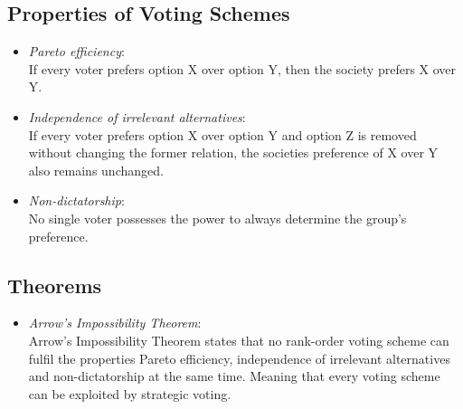 \documentclass[conference]{IEEEtran}
\begin{document}
\subsection{Properties of Voting Schemes}
\begin{itemize}
    \item \textit{Pareto efficiency}:\\
    If every voter prefers option X over option Y, then the society prefers X over Y.
    \item \textit{Independence of irrelevant alternatives}:\\
    If every voter prefers option X over option Y and option Z is removed without changing the former relation, the societies preference of X over Y also remains unchanged.
    \item \textit{Non-dictatorship}:\\
    No single voter possesses the power to always determine the group's preference.
\end{itemize}

\subsection{Theorems}
\begin{itemize}
    \item \textit{Arrow's Impossibility Theorem}\cite{arrow2012social}:\\
    Arrow's Impossibility Theorem states that no rank-order voting scheme can fulfil the properties Pareto efficiency, independence of irrelevant alternatives and non-dictatorship at the same time.
    Meaning that every voting scheme can be exploited by strategic voting.\cite{pitt2006voting}
\end{itemize}


\end{document}
